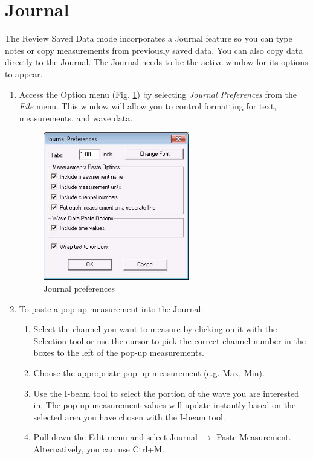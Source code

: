 \documentclass{article}
\begin{document}
\section*{Journal}
The Review Saved Data mode incorporates a Journal feature so you can type notes or copy measurements from previously saved data. You can also copy data directly to the Journal. The Journal needs to be the active window for its options to appear.
\begin{enumerate}
	\item Access the Option menu (Fig. \ref{journal}) by selecting \textit{Journal Preferences} from the \textit{File} menu. This window will allow you to control formatting for text, measurements, and wave data.
		\begin{figure}[h]
		\includegraphics[width=0.6\textwidth]{../images/BIOPAC_14.jpg}
		\centering
		\caption{Journal preferences}
		\label{journal}
		\end{figure}

	\item To paste a pop-up measurement into the Journal:
		\begin{enumerate}
			\item Select the channel you want to measure by clicking on it with the Selection tool or use the cursor to pick the correct channel number in the boxes to the left of the pop-up measurements.
			\item Choose the appropriate pop-up measurement (e.g. Max, Min).
			\item Use the I-beam tool to select the portion of the wave you are interested in. The pop-up measurement values will update instantly based on the selected area you have chosen with the I-beam tool.
			\item Pull down the Edit menu and select Journal $\rightarrow$ Paste Measurement. Alternatively, you can use Ctrl+M.
		\end{enumerate}
	\end{enumerate}
\end{document}
